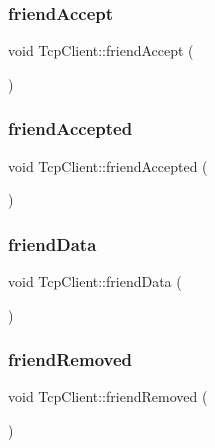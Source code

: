 \subsubsection{\texorpdfstring{friend\+Accept}{friendAccept}}
{\footnotesize\ttfamily void Tcp\+Client\+::friend\+Accept (\begin{DoxyParamCaption}\item[{I\+Packet \&}]{ }\end{DoxyParamCaption})\hspace{0.3cm}{\ttfamily [signal]}}

\mbox{\label{classTcpClient_a2b6f00394075b596127c417fac45b5da}} 
\subsubsection{\texorpdfstring{friend\+Accepted}{friendAccepted}}
{\footnotesize\ttfamily void Tcp\+Client\+::friend\+Accepted (\begin{DoxyParamCaption}\item[{I\+Packet \&}]{ }\end{DoxyParamCaption})\hspace{0.3cm}{\ttfamily [signal]}}

\mbox{\label{classTcpClient_a46d4348145c683e36d96b1d5f212ccda}} 
\subsubsection{\texorpdfstring{friend\+Data}{friendData}}
{\footnotesize\ttfamily void Tcp\+Client\+::friend\+Data (\begin{DoxyParamCaption}\item[{I\+Packet \&}]{ }\end{DoxyParamCaption})\hspace{0.3cm}{\ttfamily [signal]}}

\mbox{\label{classTcpClient_abe865ff0c9d713996ecc9f075e60f385}} 
\subsubsection{\texorpdfstring{friend\+Removed}{friendRemoved}}
{\footnotesize\ttfamily void Tcp\+Client\+::friend\+Removed (\begin{DoxyParamCaption}\item[{I\+Packet \&}]{ }\end{DoxyParamCaption})\hspace{0.3cm}{\ttfamily [signal]}}

